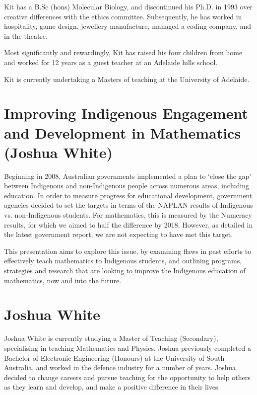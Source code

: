 \documentclass[twoside,14pt,a4paper,notitlepage]{memoir}
\begin{document}
Kit has a B.Sc (hons) Molecular Biology, and discontinued his Ph.D. in 1993 over creative differences with the ethics committee. Subsequently, he has worked in hospitality, game design, jewellery manufacture, managed a coding company, and in the theatre.

Most significantly and rewardingly, Kit has raised his four children from home and worked for 12 years as a guest teacher at an Adelaide hills school.

Kit is currently undertaking a Masters of teaching at the University of Adelaide.



\section*{Improving Indigenous Engagement and Development in Mathematics (Joshua White)}
\label{aut:white}

Beginning in 2008, Australian governments implemented a plan to ‘close the gap’ between Indigenous and non-Indigenous people across numerous areas, including education. In order to measure progress for educational development, government agencies decided to set the targets in terms of the NAPLAN results of Indigenous vs. non-Indigenous students. For mathematics, this is measured by the Numeracy results, for which we aimed to half the difference by 2018. However, as detailed in the latest government report, we are not expecting to have met this target.
 
This presentation aims to explore this issue, by examining flaws in past efforts to effectively teach mathematics to Indigenous students, and outlining programs, strategies and research that are looking to improve the Indigenous education of mathematics, now and into the future.

\section*{Joshua White}

Joshua White is currently studying a Master of Teaching (Secondary), specialising in teaching Mathematics and Physics. Joshua previously completed a Bachelor of Electronic Engineering (Honours) at the University of South Australia, and worked in the defence industry for a number of years. Joshua decided to change careers and pursue teaching for the opportunity to help others as they learn and develop, and make a positive difference in their lives.
\end{document}
